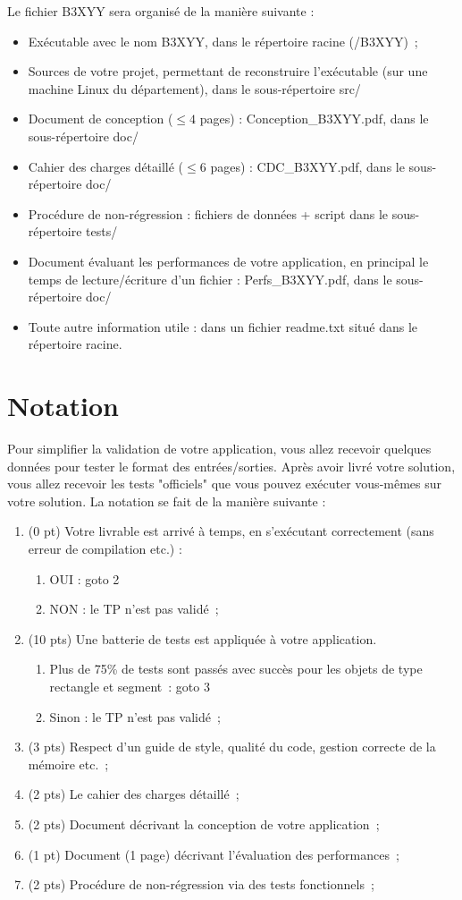 \documentclass[oneside]{book}
\begin{document}
Le fichier B3XYY sera organisé de la manière suivante :
\begin{itemize}
	\item Exécutable avec le nom B3XYY, dans le répertoire racine (/B3XYY)~;
	\item Sources de votre projet, permettant de reconstruire l'exécutable (sur une machine Linux du département), dans le sous-répertoire src/
	\item Document de conception ($\leq 4$ pages) : Conception\_B3XYY.pdf, dans le sous-répertoire doc/
	\item Cahier des charges détaillé ($\leq 6$ pages) : CDC\_B3XYY.pdf, dans le sous-répertoire doc/
	\item Procédure de non-régression : fichiers de données + script dans le sous-répertoire tests/
	\item Document évaluant les performances de votre application, en principal le temps de lecture/écriture d'un fichier : Perfs\_B3XYY.pdf, dans le sous-répertoire doc/
	\item Toute autre information utile : dans un fichier readme.txt situé dans le répertoire racine.
\end{itemize}

\pagebreak

\section*{Notation}
Pour simplifier la validation de votre application, vous allez recevoir quelques données pour tester le format des entrées/sorties. Après avoir livré votre solution, vous allez recevoir les tests "officiels" que vous pouvez exécuter vous-mêmes sur votre solution.
La notation se fait de la manière suivante :
\begin{enumerate}
	\item(0 pt) Votre livrable est arrivé à temps, en s'exécutant correctement (sans erreur de compilation etc.) :
	\begin{enumerate}
		\item OUI : goto 2
		\item NON : le TP n'est pas validé~;
	\end{enumerate}
	\item(10 pts) Une batterie de tests est appliquée à votre application. 
	\begin{enumerate}
		\item Plus de 75\% de tests sont passés avec succès pour les objets de type rectangle et segment~: goto 3
		\item Sinon : le TP n'est pas validé~;
	\end{enumerate}
	\item(3 pts) Respect d'un guide de style, qualité du code, gestion correcte de la mémoire etc.~;
	\item(2 pts) Le cahier des charges détaillé~;
	\item(2 pts) Document décrivant la conception de votre application~;
	\item(1 pt) Document (1 page) décrivant l'évaluation des performances~;
	\item(2 pts) Procédure de non-régression via des tests fonctionnels~;
\end{enumerate}
\end{document}
